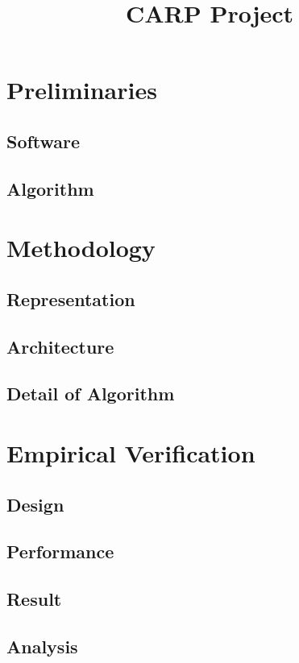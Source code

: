 \documentclass[conference,compsoc]{IEEEtran}
\begin{document}
\title{CARP Project}
\author{
}
\maketitle
\IEEEpeerreviewmaketitle



\section{Preliminaries}

\subsection{Software}


\subsection{Algorithm}

\section{Methodology}
\subsection{Representation}

\subsection{Architecture}

\subsection{Detail of Algorithm}
 

\section{Empirical Verification}
\subsection{Design}

\subsection{Performance}

\subsection{Result}

\subsection{Analysis}




\cite{rivest1987game}
\cite{knuth1975analysis}
\end{document}
